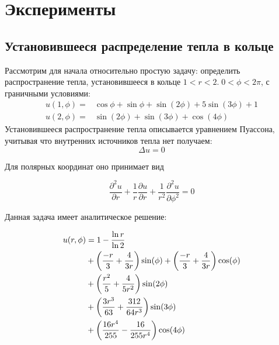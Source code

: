 \documentclass[a4paper,14pt]{extarticle} %
\begin{document}

\FloatBarrier
\newpage
\section{Эксперименты}

\subsection{Установившееся распределение тепла в кольце}

Рассмотрим для начала относительно простую задачу: определить распространение тепла, установившееся в кольце $1<r<2.\; 0<\phi<2\pi$, с граничными условиями:
\begin{equation}
    \begin{aligned}
        u(1,\phi)=&\cos\phi+\sin\phi+\sin(2\phi)+5\sin(3\phi)+1\\
        u(2,\phi)=&\sin(2\phi)+\sin(3\phi)+\cos(4\phi)
    \end{aligned}
\end{equation}
Установившееся распространение тепла описывается уравнением Пуассона, учитывая что внутренних источников тепла нет получаем:
\begin{equation}
    \Delta u = 0
\end{equation}

Для полярных координат оно принимает вид

\begin{equation}
    \frac{\partial^2 u}{\partial r} + \frac{1}{r} \frac{\partial u}{\partial r} + \frac{1}{r^2}\frac{\partial^2 u}{\partial \phi^2} = 0
\end{equation}

Данная задача имеет аналитическое решение:

\begin{equation}\label{eq:termal}
    \begin{split}
        u(r,\phi) & = 1-\frac{\ln r}{\ln 2}\\
        &+{\left( \frac{-r}{3}+\frac{4}{3r} \right)}\sin(\phi)+{\left( \frac{-r}{3}+\frac{4}{3r} \right)}\cos(\phi)\\
        &+{\left( \frac{r^2}{5}+\frac{4}{5r^2} \right)}\sin(2\phi)\\
        &+{\left( \frac{3r^3}{63}+\frac{312}{64r^3} \right)}\sin(3\phi)\\
        &+{\left( \frac{16r^4}{255}-\frac{16}{255r^4} \right)}\cos(4\phi)
    \end{split}
\end{equation}
\end{document}
